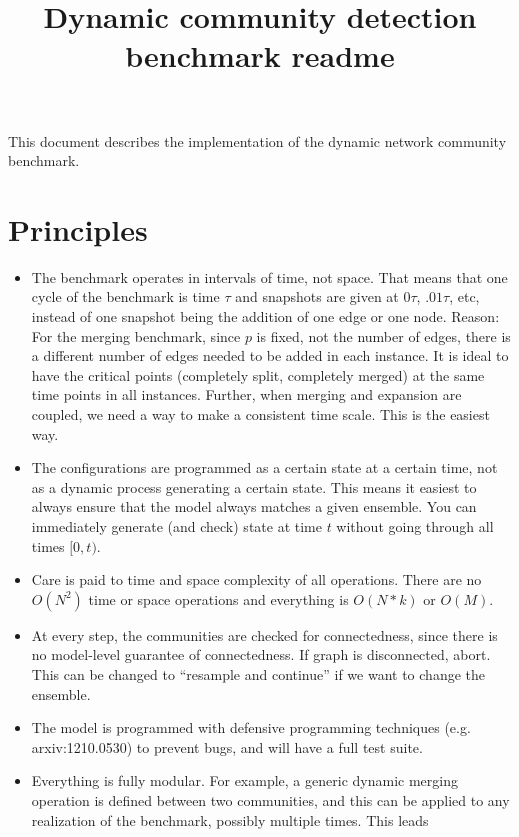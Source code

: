 \documentclass{article}
\title{Dynamic community detection benchmark readme}
\begin{document}
\maketitle

This document describes the implementation of the dynamic network
community benchmark.


\section{Principles}
\label{sec:principles}

\begin{itemize}
\item The benchmark operates in intervals of time, not space.  That
  means that one cycle of the benchmark is time $\tau$ and snapshots
  are given at $0\tau$, $.01\tau$, etc, instead of one snapshot being
  the addition of one edge or one node.  Reason: For the merging
  benchmark, since $p$ is fixed, not the number of edges, there is a
  different number of edges needed to be added in each instance.  It is ideal to have
  the critical points (completely split, completely merged) at the
  same time points in all instances.  Further, when merging and
  expansion are coupled, we need a way to make a consistent time
  scale.  This is the easiest way.
\item The configurations are programmed as a certain state at a certain
  time, not as a dynamic process generating a certain state.  This
  means it easiest to always ensure that the model always matches a
  given ensemble.  You can immediately generate (and check) state at
  time $t$ without going through all times $[0,t)$.
\item Care is paid to time and space complexity of all operations.
  There are no $O(N^2)$ time or space operations and everything is
  $O(N*k)$ or $O(M)$.
\item At every step, the communities are checked for connectedness,
  since there is no model-level guarantee of connectedness.  If graph
  is disconnected, abort.  This can be changed to ``resample and
  continue'' if we want to change the ensemble.
\item The model is programmed with defensive programming techniques
  (e.g. arxiv:1210.0530) to prevent bugs, and will have a full test suite.
\item Everything is fully modular.  For example, a generic dynamic merging operation is
  defined between two communities, and this can be applied to any
  realization of the benchmark, possibly multiple times.  This leads

\end{itemize}
\end{document}
